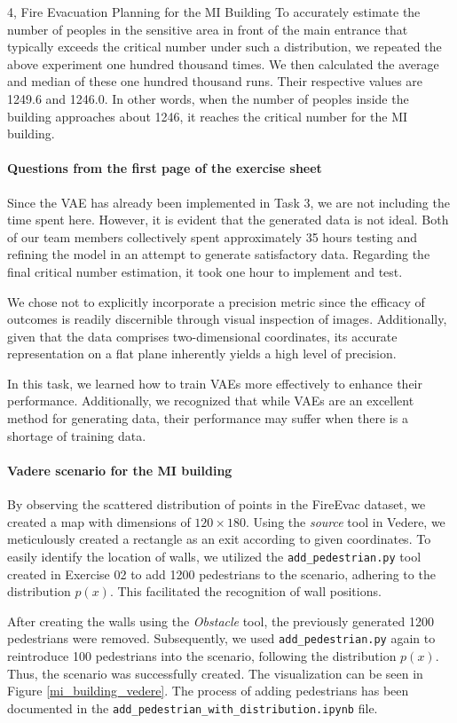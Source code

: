 \begin{task}{4, Fire Evacuation Planning for the MI Building}
To accurately estimate the number of peoples in the sensitive area in front of the main entrance that typically exceeds the critical number under such a distribution, we repeated the above experiment one hundred thousand times. We then calculated the average and median of these one hundred thousand runs. Their respective values are 1249.6 and 1246.0. In other words, when the number of peoples inside the building approaches about 1246, it reaches the critical number for the MI building.


\paragraph{Questions from the first page of the exercise sheet}
Since the VAE has already been implemented in Task 3, we are not including the time spent here. However, it is evident that the generated data is not ideal. Both of our team members collectively spent approximately 35 hours testing and refining the model in an attempt to generate satisfactory data. Regarding the final critical number estimation, it took one hour to implement and test.

We chose not to explicitly incorporate a precision metric since the efficacy of outcomes is readily discernible through visual inspection of images. Additionally, given that the data comprises two-dimensional coordinates, its accurate representation on a flat plane inherently yields a high level of precision.

In this task, we learned how to train VAEs more effectively to enhance their performance. Additionally, we recognized that while VAEs are an excellent method for generating data, their performance may suffer when there is a shortage of training data.

\paragraph{Vadere scenario for the MI building}
By observing the scattered distribution of points in the FireEvac dataset, we created a map with dimensions of $120 \times 180$. Using the \textit{source} tool in Vedere, we meticulously created a rectangle as an exit according to given coordinates. To easily identify the location of walls, we utilized the \texttt{add\_pedestrian.py} tool created in Exercise 02 to add 1200 pedestrians to the scenario, adhering to the distribution $p(x)$. This facilitated the recognition of wall positions.

After creating the walls using the \textit{Obstacle} tool, the previously generated 1200 pedestrians were removed. Subsequently, we used \texttt{add\_pedestrian.py} again to reintroduce 100 pedestrians into the scenario, following the distribution $p(x)$. Thus, the scenario was successfully created. The visualization can be seen in Figure \ref{mi_building_vedere}. The process of adding pedestrians has been documented in the \texttt{add\_pedestrian\_with\_distribution.ipynb} file.


\end{task}
